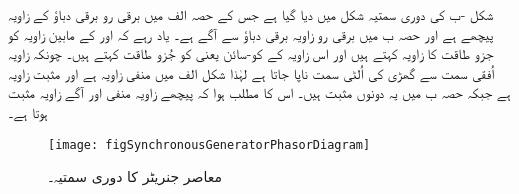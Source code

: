  شکل -ب کی دوری سمتیہ شکل   میں دیا گیا ہے جس کے حصہ الف میں  برقی رو  برقی دباؤ  کے  زاویہ   پیچھے ہے اور حصہ ب میں برقی رو  زاویہ برقی دباؤ سے  آگے ہے۔ یاد رہے کہ  اور  کے مابین زاویہ  کو جزو طاقت کا زاویہ کہتے ہیں اور اس زاویہ کے کو-سائن یعنی   کو  جُزو طاقت کہتے ہیں۔ چونکہ زاویہ اُفقی سمت سے گھڑی کی اُلٹی سمت ناپا جاتا ہے لہٰذا شکل الف میں  منفی زاویہ ہے اور  مثبت زاویہ ہے جبکہ حصہ ب میں یہ دونوں مثبت ہیں۔ اس کا مطلب ہوا کہ  پیچھے زاویہ منفی اور آگے زاویہ مثبت ہوتا ہے۔
\begin{figure}
\centering
\texttt{[image: figSynchronousGeneratorPhasorDiagram]}
\caption{معاصر جنریٹر کا دوری سمتیہ۔}
\label{شکل_معاصر_جنریٹر_دوری_سمتیہ}
\end{figure}

